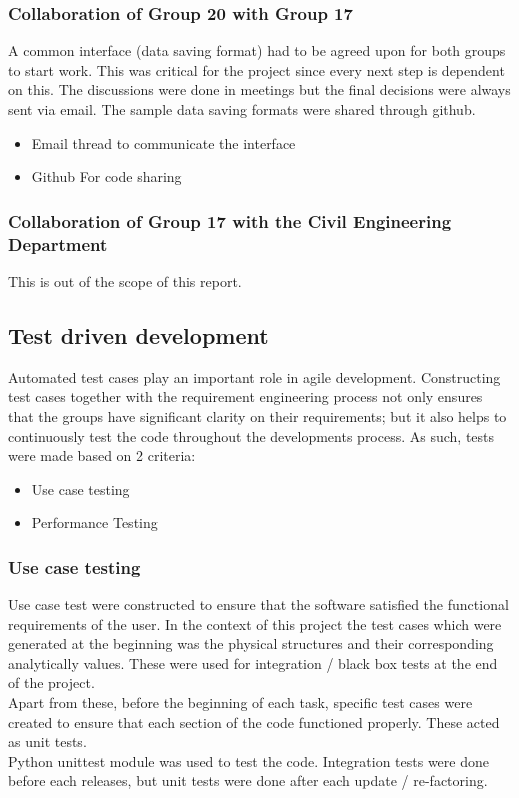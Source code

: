 \documentclass[12pt]{article}
\begin{document}
\subsubsection{Collaboration of Group 20 with Group 17}

A common interface (data saving format) had to be agreed upon for both groups to start work. This was critical for the project since every next step is dependent on this. The discussions were done in meetings but the final decisions were always sent via email. The sample data saving formats were shared through github.\\

\begin{itemize}
    \item Email thread to communicate the interface
    \item Github For code sharing
\end{itemize}

\subsubsection{Collaboration of Group 17 with the Civil Engineering Department}
This is out of the scope of this report.\\


\subsection{Test driven development}
Automated test cases play an important role in agile development. Constructing test cases together with the requirement engineering process not only ensures that the groups have significant clarity on their requirements; but it also helps to continuously test the code throughout the developments process. As such, tests were made based on 2 criteria:
\begin{itemize}
    \item Use case testing
    \item Performance Testing
\end{itemize}


\subsubsection{Use case testing}
Use case test were constructed to ensure that the software satisfied the functional requirements of the user. In the context of this project the test cases which were generated at the beginning was the physical structures and their corresponding analytically values. These were used for integration / black box tests at the end of the project.\\
Apart from these, before the beginning of each task, specific test cases were created to ensure that each section of the code functioned properly. These acted as unit tests.\\
Python unittest module was used to test the code. Integration tests were done before each releases, but unit tests were done after each update / re-factoring.\\
\end{document}
